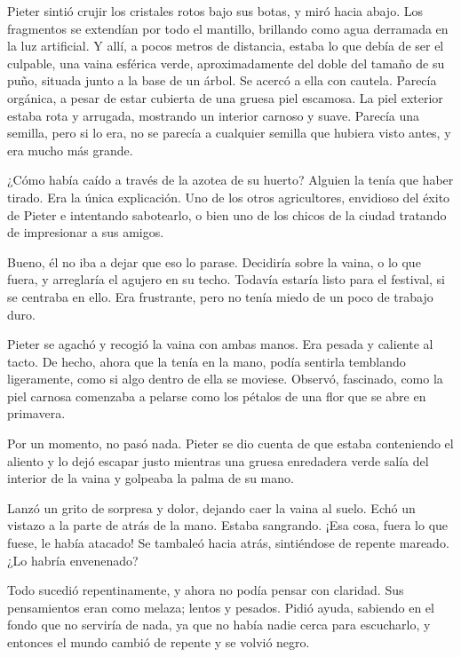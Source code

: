 Pieter sintió crujir los cristales rotos bajo sus botas, y miró hacia abajo. Los fragmentos se extendían por todo el mantillo, brillando como agua derramada en la luz artificial. Y allí, a pocos metros de distancia, estaba lo que debía de ser el culpable, una vaina esférica verde, aproximadamente del doble del tamaño de su puño, situada junto a la base de un árbol. Se acercó a ella con cautela. Parecía orgánica, a pesar de estar cubierta de una gruesa piel escamosa. La piel exterior estaba rota y arrugada, mostrando un interior carnoso y suave. Parecía una semilla, pero si lo era, no se parecía a cualquier semilla que hubiera visto antes, y era mucho más grande.



¿Cómo había caído a través de la azotea de su huerto? Alguien la tenía que haber tirado. Era la única explicación. Uno de los otros agricultores, envidioso del éxito de Pieter e intentando sabotearlo, o bien uno de los chicos de la ciudad tratando de impresionar a sus amigos.



Bueno, él no iba a dejar que eso lo parase. Decidiría sobre la vaina, o lo que fuera, y arreglaría el agujero en su techo. Todavía estaría listo para el festival, si se centraba en ello. Era frustrante, pero no tenía miedo de un poco de trabajo duro.



Pieter se agachó y recogió la vaina con ambas manos. Era pesada y caliente al tacto. De hecho, ahora que la tenía en la mano, podía sentirla temblando ligeramente, como si algo dentro de ella se moviese. Observó, fascinado, como la piel carnosa comenzaba a pelarse como los pétalos de una flor que se abre en primavera.



Por un momento, no pasó nada. Pieter se dio cuenta de que estaba conteniendo el aliento y lo dejó escapar justo mientras una gruesa enredadera verde salía del interior de la vaina y golpeaba la palma de su mano.



Lanzó un grito de sorpresa y dolor, dejando caer la vaina al suelo. Echó un vistazo a la parte de atrás de la mano. Estaba sangrando. ¡Esa cosa, fuera lo que fuese, le había atacado! Se tambaleó hacia atrás, sintiéndose de repente mareado. ¿Lo habría envenenado?



Todo sucedió repentinamente, y ahora no podía pensar con claridad. Sus pensamientos eran como melaza; lentos y pesados. Pidió ayuda, sabiendo en el fondo que no serviría de nada, ya que no había nadie cerca para escucharlo, y entonces el mundo cambió de repente y se volvió negro.

